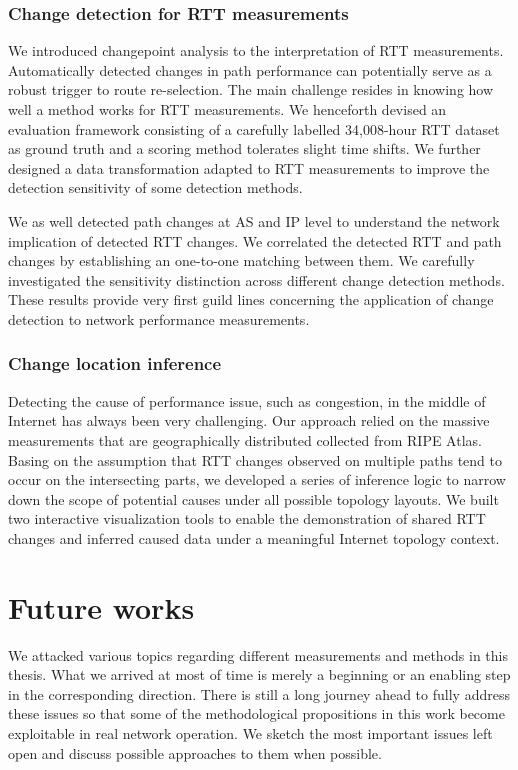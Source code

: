 \subsection{Change detection for RTT measurements}

We introduced changepoint analysis to the interpretation of RTT measurements.
Automatically detected changes in path performance can potentially serve as a robust trigger to route re-selection.
The main challenge resides in knowing how well a method works for RTT measurements.
We henceforth devised an evaluation framework consisting of a carefully labelled 34,008-hour RTT dataset as ground truth and a scoring method tolerates slight time shifts. We further designed a data transformation adapted to RTT measurements to improve the detection sensitivity of some detection methods.

We as well detected path changes at AS and IP level to understand the network implication of detected RTT changes.
We correlated the detected RTT and path changes by establishing an one-to-one matching between them. 
We carefully investigated the sensitivity distinction across different change detection methods.
These results provide very first guild lines concerning the application of change detection to network performance measurements.


\subsection{Change location inference}
Detecting the cause of performance issue, such as congestion, in the middle of Internet has always been very challenging. 
Our approach relied on the massive measurements that are geographically distributed collected from RIPE Atlas. Basing on the assumption that RTT changes observed on multiple paths tend to occur on the intersecting parts, we developed a series of inference logic to narrow down the scope of potential causes under all possible topology layouts.
We built two interactive visualization tools to enable the demonstration of shared RTT changes and inferred caused data under a meaningful Internet topology context.


\chapter{Future works}
We attacked various topics regarding different measurements and methods in this thesis.
What we arrived at most of time is merely a beginning or an enabling step in the corresponding direction.
There is still a long journey ahead to fully address these issues so that some of the methodological propositions in this work become exploitable in real network operation.
We sketch the most important issues left open and discuss possible approaches to them when possible.

